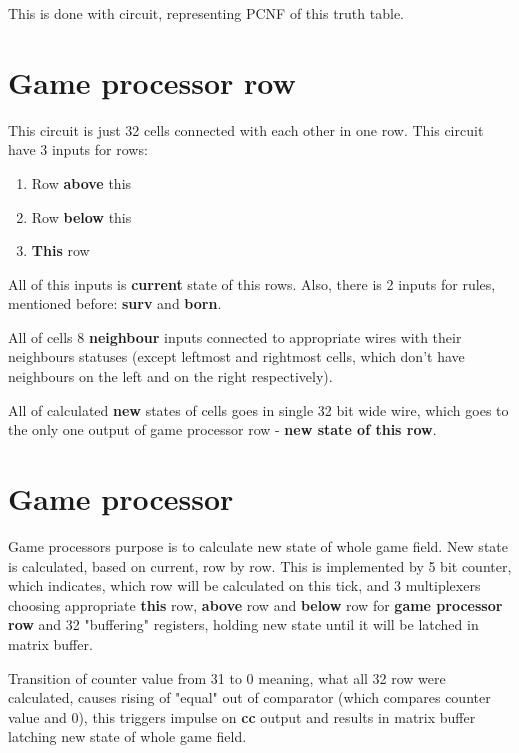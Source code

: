This is done with circuit, representing PCNF of this truth table.

\section*{Game processor row}

This circuit is just 32 cells connected with each other in one row. This circuit have 3 inputs for rows:

\begin{enumerate}
	\item Row \textbf{above} this
	\item Row \textbf{below} this
	\item \textbf{This} row
\end{enumerate}

All of this inputs is \textbf{current} state of this rows.
Also, there is 2 inputs for rules, mentioned before: \textbf{surv} and \textbf{born}.

All of cells 8 \textbf{neighbour} inputs connected to appropriate wires with their neighbours statuses (except leftmost and rightmost cells, which don't have neighbours on the left and on the right respectively).

All of calculated \textbf{new} states of cells goes in single 32 bit wide wire, which goes to the only one output of game processor row - \textbf{new state of this row}.

\section*{Game processor}

Game processors purpose is to calculate new state of whole game field. New state is calculated, based on current, row by row. This is implemented by 5 bit counter, which indicates, which row will be calculated on this tick, and 3 multiplexers choosing appropriate \textbf{this} row, \textbf{above} row and \textbf{below} row for \textbf{game processor row} and 32 "buffering" registers, holding new state until it will be latched in matrix buffer.

Transition of counter value from 31 to 0 meaning, what all 32 row were calculated, causes rising of "equal" out of comparator (which compares counter value and 0), this triggers impulse on \textbf{cc} output and results in matrix buffer latching new state of whole game field.

